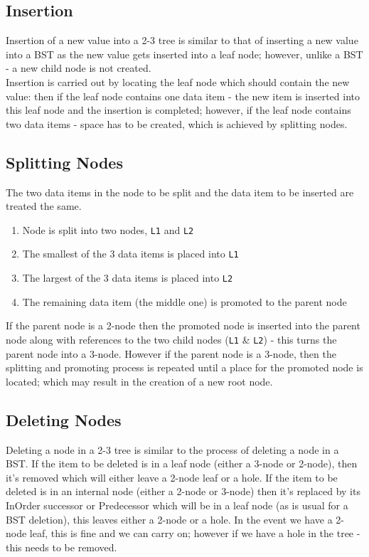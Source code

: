 \subsection{Insertion}
Insertion of a new value into a 2-3 tree is similar to that of inserting a new value into a BST as the new value gets inserted into a leaf node; however, unlike a BST - a new child node is not created.\\

Insertion is carried out by locating the leaf node which should contain the new value: then if the leaf node contains one data item - the new item is inserted into this leaf node and the insertion is completed; however, if the leaf node contains two data items - space has to be created, which is achieved by splitting nodes.

\subsection{Splitting Nodes}
The two data items in the node to be split and the data item to be inserted are treated the same.
\begin{enumerate}
    \item Node is split into two nodes, \verb|L1| and \verb|L2|
    \item The smallest of the 3 data items is placed into \verb|L1|
    \item The largest of the 3 data items is placed into \verb|L2|
    \item The remaining data item (the middle one) is promoted to the parent node
\end{enumerate}

If the parent node is a 2-node then the promoted node is inserted into the parent node along with references to the two child nodes (\verb|L1| \& \verb|L2|) - this turns the parent node into a 3-node. However if the parent node is a 3-node, then the splitting and promoting process is repeated until a place for the promoted node is located; which may result in the creation of a new root node.

\subsection{Deleting Nodes}
Deleting a node in a 2-3 tree is similar to the process of deleting a node in a BST. If the item to be deleted is in a leaf node (either a 3-node or 2-node), then it's removed which will either leave a 2-node leaf or a hole. If the item to be deleted is in an internal node (either a 2-node or 3-node) then it's replaced by its InOrder successor or Predecessor which will be in a leaf node (as is usual for a BST deletion), this leaves either a 2-node or a hole. In the event we have a 2-node leaf, this is fine and we can carry on; however if we have a hole in the tree - this needs to be removed.\\


